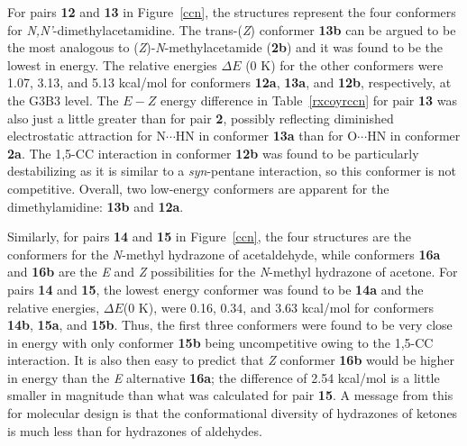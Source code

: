 \documentclass[12pt]{report}
\def\tablab{Table}\def\tabslab{\tablab s}
\def\figlab{Figure}\def\figslab{\figlab s}
\newcommand*\tbl[1]{\tablab~\ref{#1}}
\newcommand*\fig[1]{\figlab~\ref{#1}}
\begin{document}
For pairs \textbf{12} and \textbf{13} in \fig{ccn}, the structures represent the four conformers for \textit{N,N'}-dimethylacetamidine. The trans-(\textit{Z}) conformer \textbf{13b} can be argued to be the most analogous to (\textit{Z})-\textit{N}-methylacetamide (\textbf{2b}) and it was found to be the lowest in energy. The relative energies $\Delta E$ (0 K) for the other conformers were 1.07, 3.13, and 5.13 kcal/mol for conformers \textbf{12a}, \textbf{13a}, and \textbf{12b}, respectively, at the G3B3 level. The $E-Z$ energy difference in \tbl{rxcoyrccn} for pair \textbf{13} was also just a little greater than for pair \textbf{2}, possibly reflecting diminished electrostatic attraction for N$\cdots$HN in conformer \textbf{13a} than for O$\cdots$HN in conformer \textbf{2a}. The 1,5-CC interaction in conformer \textbf{12b} was found to be particularly destabilizing as it is similar to a \textit{syn}-pentane interaction, so this conformer is not competitive. Overall, two low-energy conformers are apparent for the dimethylamidine: \textbf{13b} and \textbf{12a}.

Similarly, for pairs \textbf{14} and \textbf{15} in \fig{ccn}, the four structures are the conformers for the \textit{N}-methyl hydrazone of acetaldehyde, while conformers \textbf{16a} and \textbf{16b} are the \textit{E} and \textit{Z} possibilities for the \textit{N}-methyl hydrazone of acetone. For pairs \textbf{14} and \textbf{15}, the lowest energy conformer was found to be \textbf{14a} and the relative energies, $\Delta E$(0 K), were 0.16, 0.34, and 3.63 kcal/mol for conformers \textbf{14b}, \textbf{15a}, and \textbf{15b}. Thus, the first three conformers were found to be very close in energy with only conformer \textbf{15b} being uncompetitive owing to the 1,5-CC interaction. It is also then easy to predict that \textit{Z} conformer \textbf{16b} would be higher in energy than the \textit{E} alternative \textbf{16a}; the difference of 2.54 kcal/mol is a little smaller in magnitude than what was calculated for pair \textbf{15}. A message from this for molecular design is that the conformational diversity of hydrazones of ketones is much less than for hydrazones of aldehydes.
\end{document}

